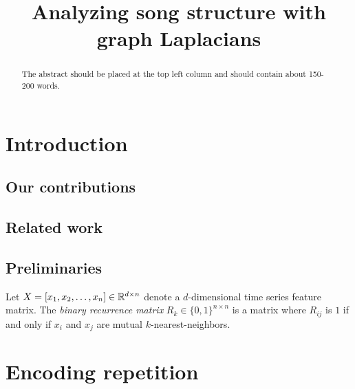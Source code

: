 \documentclass{article}
\title{Analyzing song structure with graph Laplacians}
\begin{document}
%
\maketitle
%
\begin{abstract}
The abstract should be placed at the top left column and should contain about 150-200 words.
\end{abstract}
%
\section{Introduction}\label{sec:introduction}

\subsection{Our contributions}

\subsection{Related work}

\cite{chung1997spectral, von2007tutorial}

\cite{serra2012unsupervised}

\subsection{Preliminaries}
Let $X = [x_1, x_2, \dots, x_n] \in \mathbb{R}^{d\times n}$ denote a $d$-dimensional time
series feature matrix.  The \emph{binary recurrence matrix} $R_k \in \{0,1\}^{n\times
n}$ is a matrix where $R_{ij}$ is $1$ if and only if $x_i$ and $x_j$ are mutual 
$k$-nearest-neighbors.

\section{Encoding repetition}


\end{document}
